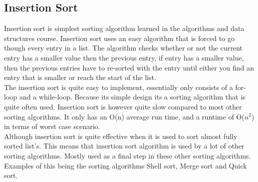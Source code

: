 \subsection{Insertion Sort}
Insertion sort is simplest sorting algorithm learned in the algorithms and data structures course. Insertion sort uses an easy algorithm that is forced to go though every entry in a list. The algorithm checks whether or not the current entry has a smaller value then the previous entry, if entry has a smaller value, then the previous entries have to re-sorted with the entry until either you find an entry that is smaller or reach the start of the list. 
\\[11pt]
The insertion sort is quite easy to implement, essentially only consists of a for-loop and a while-loop. Because its simple design its a sorting algorithm that is quite often used. Insertion sort is however quite slow compared to most other sorting algorithms. It only has an O(n) average run time, and a runtime of O($n^2$) in terms of worst case scenario.
\\[11pt]
Although insertion sort is quite effective when it is used to sort almost fully sorted list's. This means that insertion sort algorithm is used by a lot of other sorting algorithms. Mostly used as a final step in these other sorting algorithms. Examples of this being the sorting algorithms Shell sort, Merge sort and Quick sort.	%